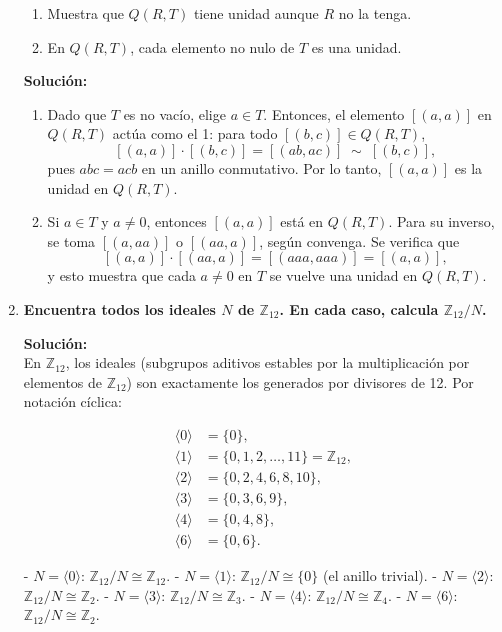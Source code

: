\documentclass[12pt]{article}
\theoremstyle{definition}
\theoremstyle{remark}
\begin{document}
\begin{enumerate}[label=\textbf{\arabic*.}]
\begin{enumerate}[label=(\alph*)]
\item Muestra que \(Q(R, T)\) tiene unidad aunque \(R\) no la tenga.  
\item En \(Q(R, T)\), cada elemento no nulo de \(T\) es una unidad.
\end{enumerate}

\textbf{Solución:}\\
\begin{enumerate}[label=(\alph*)]
\item Dado que $T$ es no vacío, elige $a \in T$. Entonces, el elemento $[(a,a)]$ en $Q(R,T)$ actúa como el 1: para todo $[(b,c)] \in Q(R,T)$,
\[
[(a,a)] \cdot [(b,c)] = [(ab, ac)] \;\sim\; [(b,c)],
\]
pues $abc = acb$ en un anillo conmutativo. Por lo tanto, $[(a,a)]$ es la unidad en $Q(R,T)$.

\item Si $a \in T$ y $a \neq 0$, entonces $[(a,a)]$ está en $Q(R,T)$. Para su inverso, se toma $[(a,aa)]$ o $[(aa,a)]$, según convenga. Se verifica que
\[
[(a,a)] \cdot [(aa,a)] 
= [(aaa, aa a)]
= [(a,a)],
\]
y esto muestra que cada $a\neq 0$ en $T$ se vuelve una unidad en $Q(R,T)$.
\end{enumerate}


\item \textbf{Encuentra todos los ideales $N$ de $\mathbb{Z}_{12}$. En cada caso, calcula $\mathbb{Z}_{12}/N$.}

\textbf{Solución:}\\
En $\mathbb{Z}_{12}$, los ideales (subgrupos aditivos estables por la multiplicación por elementos de $\mathbb{Z}_{12}$) son exactamente los generados por divisores de 12. Por notación cíclica:

\begin{align*}
\langle 0 \rangle &= \{0\}, \\
\langle 1 \rangle &= \{0,1,2,\dots,11\} = \mathbb{Z}_{12}, \\
\langle 2 \rangle &= \{0,2,4,6,8,10\}, \\
\langle 3 \rangle &= \{0,3,6,9\}, \\
\langle 4 \rangle &= \{0,4,8\}, \\
\langle 6 \rangle &= \{0,6\}.
\end{align*}


\smallskip
- $N = \langle 0 \rangle$:  $\mathbb{Z}_{12}/N \cong \mathbb{Z}_{12}$.
- $N = \langle 1 \rangle$:  $\mathbb{Z}_{12}/N \cong \{0\}$ (el anillo trivial).
- $N = \langle 2 \rangle$:  $\mathbb{Z}_{12}/N \cong \mathbb{Z}_2$.
- $N = \langle 3 \rangle$:  $\mathbb{Z}_{12}/N \cong \mathbb{Z}_3$.
- $N = \langle 4 \rangle$:  $\mathbb{Z}_{12}/N \cong \mathbb{Z}_4$.
- $N = \langle 6 \rangle$:  $\mathbb{Z}_{12}/N \cong \mathbb{Z}_2$.



\end{enumerate}
\end{document}
